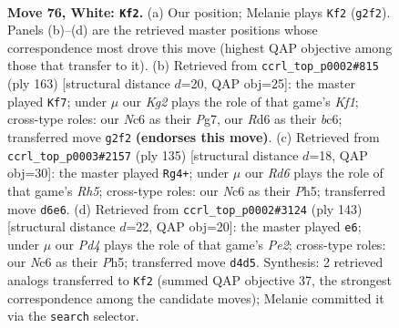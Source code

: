 \documentclass[11pt]{article}
\begin{document}
\clearpage

\begin{figure}[p]\centering
\begin{subfigure}{0.46\textwidth}\centering
\resizebox{\linewidth}{!}{%
\newchessgame
\chessboard[
  setfen={4k3/6p1/2NR1p2/7p/3P3P/r5P1/6K1/8 w - - 45 76},
  showmover=false,
  pgfstyle=straightmove, color=movearrow, markmove={g2-f2}
]}
\caption{}
\end{subfigure}\hfill
\begin{subfigure}{0.46\textwidth}\centering
\resizebox{\linewidth}{!}{%
\newchessgame
\chessboard[
  setfen={5k2/6p1/2B4p/4R3/p7/P1nr3P/7K/8 b - - 14 82},
  showmover=false,
  pgfstyle=straightmove, color=movearrow, markmove={f8-f7}
]}
\caption{}
\end{subfigure}
\\[4pt]
\begin{subfigure}{0.46\textwidth}\centering
\resizebox{\linewidth}{!}{%
\newchessgame
\chessboard[
  setfen={8/6k1/3R2p1/5pPp/5P1r/4P3/6K1/8 b - - 5 68},
  showmover=false,
  pgfstyle=straightmove, color=movearrow, markmove={h4-g4}
]}
\caption{}
\end{subfigure}\hfill
\begin{subfigure}{0.46\textwidth}\centering
\resizebox{\linewidth}{!}{%
\newchessgame
\chessboard[
  setfen={8/3kp3/8/5r1p/R5pP/8/5PK1/8 b - - 19 72},
  showmover=false,
  pgfstyle=straightmove, color=movearrow, markmove={e7-e6}
]}
\caption{}
\end{subfigure}
\caption{\textbf{Move 76, White: \texttt{Kf2}.} (a) Our position; Melanie plays \texttt{Kf2} (\texttt{g2f2}). Panels (b)--(d) are the retrieved master positions whose correspondence most drove this move (highest QAP objective among those that transfer to it). (b) Retrieved from \texttt{ccrl\_top\_p0002\#815} (ply 163) [structural distance $d$=20, QAP obj=25]: the master played \texttt{Kf7}; under $\mu$ our \emph{Kg2} plays the role of that game's \emph{Kf1}; cross-type roles: our \emph{N}c6 as their \emph{P}g7, our \emph{R}d6 as their \emph{b}c6; transferred move \texttt{g2f2} \textbf{(endorses this move)}. (c) Retrieved from \texttt{ccrl\_top\_p0003\#2157} (ply 135) [structural distance $d$=18, QAP obj=30]: the master played \texttt{Rg4+}; under $\mu$ our \emph{Rd6} plays the role of that game's \emph{Rh5}; cross-type roles: our \emph{N}c6 as their \emph{P}h5; transferred move \texttt{d6e6}. (d) Retrieved from \texttt{ccrl\_top\_p0002\#3124} (ply 143) [structural distance $d$=22, QAP obj=20]: the master played \texttt{e6}; under $\mu$ our \emph{Pd4} plays the role of that game's \emph{Pe2}; cross-type roles: our \emph{N}c6 as their \emph{P}h5; transferred move \texttt{d4d5}. Synthesis: 2 retrieved analogs transferred to \texttt{Kf2} (summed QAP objective 37, the strongest correspondence among the candidate moves); Melanie committed it via the \texttt{search} selector.}
\label{fig:thought-m150}
\end{figure}
\end{document}
